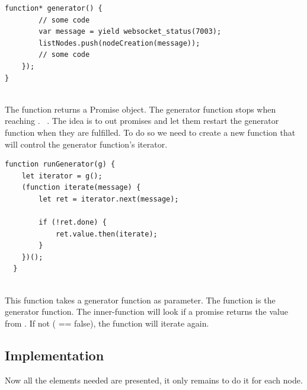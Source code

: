 \documentclass[11pt, a4paper, twoside, openright, openany]{book} %
\begin{document}
\begin{lstlisting}[caption={Extract from the project's code}, captionpos=b]
  function* generator() {
        // some code
        var message = yield websocket_status(7003);
        listNodes.push(nodeCreation(message));
        // some code
    });
}
\end{lstlisting}
\leavevmode \\
The function  returns a Promise object. The generator function
stops when reaching . ~\cite{runGenerator}.
The idea is to  out promises and let them restart the generator function when
they are fulfilled. To do so we need to create a new function that will control the generator function's iterator.\\
\begin{lstlisting}[caption={Extract from the project's code~\cite{runGenerator}}, captionpos=b]
  function runGenerator(g) {
    let iterator = g();
    (function iterate(message) {
        let ret = iterator.next(message);

        if (!ret.done) {
            ret.value.then(iterate);
        }
    })();
  }
\end{lstlisting}
\leavevmode \\
This function takes a generator function as parameter. The  function
is the generator function. The inner-function  will look if a promise
returns the value  from . If not ( == false), the function
will iterate again.\\

\subsection{Implementation}
Now all the elements needed are presented, it only remains to do it for each node.\\
\end{document}
